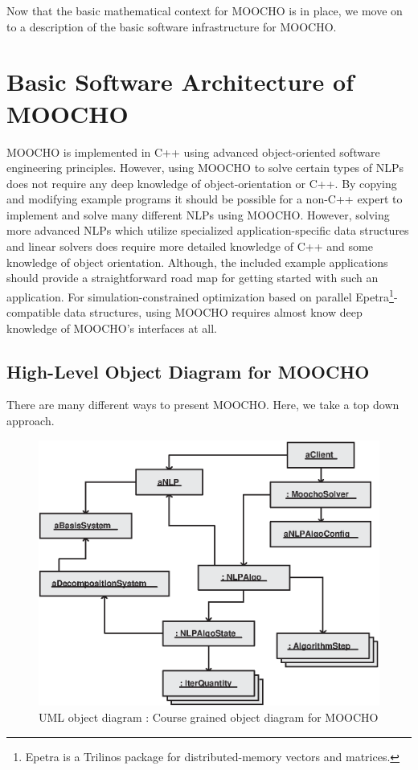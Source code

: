 \documentclass[pdf,12pt,report]{SANDreport}
\begin{document}
Now that the basic mathematical context for MOOCHO is in place, we move on to
a description of the basic software infrastructure for MOOCHO.

%
\section{Basic Software Architecture of MOOCHO}
\label{moocho:sec:basic_software_design}
%

MOOCHO is implemented in C++ using advanced object-oriented software
engineering principles.  However, using MOOCHO to solve certain types of NLPs
does not require any deep knowledge of object-orientation or C++.  By copying
and modifying example programs it should be possible for a non-C++ expert to
implement and solve many different NLPs using MOOCHO.  However, solving more
advanced NLPs which utilize specialized application-specific data structures
and linear solvers does require more detailed knowledge of C++ and some
knowledge of object orientation.  Although, the included example applications
should provide a straightforward road map for getting started with such an
application.  For simulation-constrained optimization based on parallel
Epetra\footnote{Epetra is a Trilinos package for distributed-memory vectors
and matrices.}-compatible data structures, using MOOCHO requires almost know
deep knowledge of MOOCHO's interfaces at all.

%
\subsection{High-Level Object Diagram for MOOCHO}
%

There are many different ways to present MOOCHO.  Here, we take a top down
approach.

{\bsinglespace
\begin{figure}[t]
\begin{center}
\includegraphics*[bb= 0.0in 0.0in 5.2in 4.4in,scale=0.70
]{MoochoObjDiagram}
\end{center}
\caption{
\label{moocho:fig:moocho_obj_diag}
UML object diagram : Course grained object diagram for MOOCHO
}
\end{figure}
\esinglespace}
\end{document}

